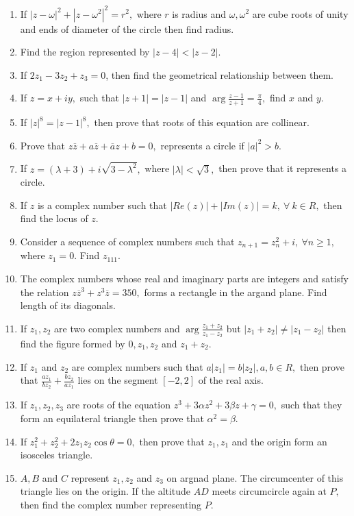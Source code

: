 \begin{enumerate}[resume]
\item If $|z - \omega|^2 + |z - \omega^2|^2 = r^2,$ where $r$ is radius and $\omega, \omega^2$ are cube roots of unity
  and ends of diameter of the circle then find radius.
\item Find the region represented by $|z - 4| < |z - 2|$.
\item If $2z_1 - 3z_2 + z_3 = 0$, then find the geometrical relationship between them.
\item If $z = x + iy,$ such that $|z + 1| = |z - 1|$ and $\arg\frac{z - 1}{z + 1} = \frac{\pi}{4},$ find $x$ and $y$.
\item If $|z|^8 = |z - 1|^8,$ then prove that roots of this equation are collinear.
\item Prove that $z\overline{z} + a\overline{z} + \overline{a}z + b = 0,$ represents a circle if $|a|^2 > b$.
\item If $z = (\lambda + 3) + i\sqrt{3 - \lambda^2},$ where $|\lambda| < \sqrt{3},$ then prove that it represents a circle.
\item If $z$ is a complex number such that $|Re(z)| + |Im(z)| = k,~\forall~ k\in R,$ then find the locus of $z$.
\item Consider a sequence of complex numbers such that $z_{n + 1} = z_n^2 + i,~\forall n\geq 1,$ where $z_1 = 0.$ Find $z_{111}$.
\item The complex numbers whose real and imaginary parts are integers and satisfy the relation $z\overline{z}^3 +
  z^3\overline{z} = 350,$ forms a rectangle in the argand plane. Find length of its diagonals.
\item If $z_1, z_2$ are two complex numbers and $\arg\frac{z_1 + z_2}{z_1 - z_2}$ but $|z_1 + z_2|\neq |z_1 - z_2|$ then
  find the figure formed by $0, z_1, z_2$ and $z_1 + z_2.$
\item If $z_1$ and $z_2$ are complex numbers such that $a|z_1| = b|z_2|, a, b\in R,$ then prove that $\frac{az_1}{bz_2} +
  \frac{bz_2}{az_1}$ lies on the segment $[-2, 2]$ of the real axis.
\item If $z_1, z_2, z_3$ are roots of the equation $z^3 + 3\alpha z^2 + 3\beta z + \gamma = 0,$ such that they form an
  equilateral triangle then prove that $\alpha^2 = \beta$.
\item If $z_1^2 + z_2^2 + 2z_1z_2\cos\theta = 0,$ then prove that $z_1, z_1$ and the origin form an isosceles triangle.
\item $A, B$ and $C$ represent $z_1, z_2$ and $z_3$ on argnad plane. The circumcenter of this triangle lies on the
  origin. If the altitude $AD$ meets circumcircle again at $P,$ then find the complex number representing $P$.

\end{enumerate}
